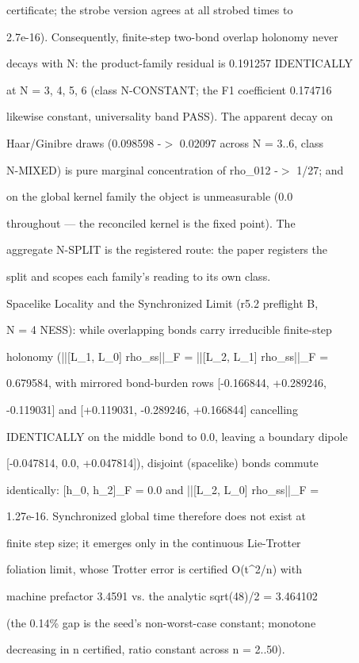 \documentclass[11pt,a4paper]{article}
\theoremstyle{definition}
\begin{document}
certificate; the strobe version agrees at all strobed times to

2.7e-16). Consequently, finite-step two-bond overlap holonomy never

decays with N: the product-family residual is 0.191257 IDENTICALLY

at N = 3, 4, 5, 6 (class N-CONSTANT; the F1 coefficient 0.174716

likewise constant, universality band PASS). The apparent decay on

Haar/Ginibre draws (0.098598 -$>$ 0.02097 across N = 3..6, class

N-MIXED) is pure marginal concentration of rho\_{012} -$>$ 1/27; and

on the global kernel family the object is unmeasurable (0.0

throughout — the reconciled kernel is the fixed point). The

aggregate N-SPLIT is the registered route: the paper registers the

split and scopes each family's reading to its own class.


Spacelike Locality and the Synchronized Limit (r5.2 preflight B,

N = 4 NESS): while overlapping bonds carry irreducible finite-step

holonomy (||[L\_1, L\_0] rho\_ss||\_F = ||[L\_2, L\_1] rho\_ss||\_F =

0.679584, with mirrored bond-burden rows [-0.166844, +0.289246,

-0.119031] and [+0.119031, -0.289246, +0.166844] cancelling

IDENTICALLY on the middle bond to 0.0, leaving a boundary dipole

[-0.047814, 0.0, +0.047814]), disjoint (spacelike) bonds commute

identically: [h\_0, h\_2]\_F = 0.0 and ||[L\_2, L\_0] rho\_ss||\_F =

1.27e-16. Synchronized global time therefore does not exist at

finite step size; it emerges only in the continuous Lie-Trotter

foliation limit, whose Trotter error is certified O(t\^{}2/n) with

machine prefactor 3.4591 vs. the analytic sqrt(48)/2 = 3.464102

(the 0.14\% gap is the seed's non-worst-case constant; monotone

decreasing in n certified, ratio constant across n = 2..50).
\end{document}
